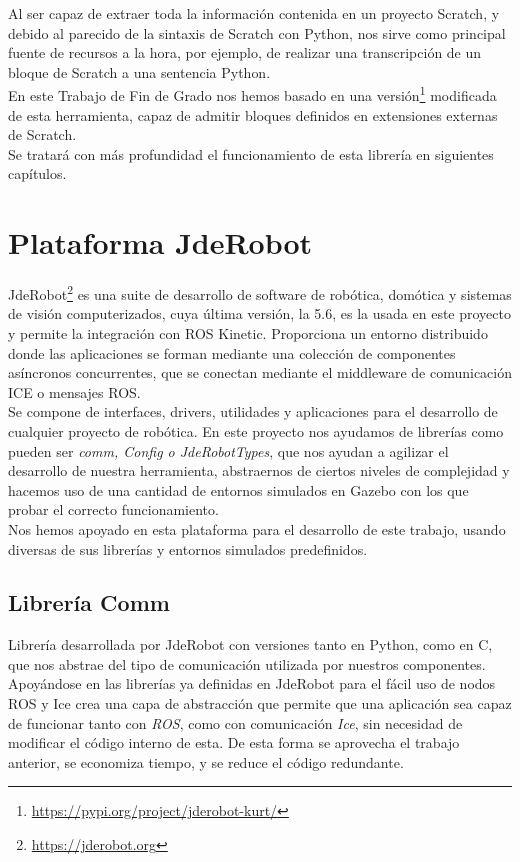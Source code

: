 Al ser capaz de extraer toda la información contenida en un proyecto Scratch, y debido al parecido de la sintaxis de Scratch con Python, nos sirve como principal fuente de recursos a la hora, por ejemplo, de realizar una transcripción de un bloque de Scratch a una sentencia Python.\\

En este Trabajo de Fin de Grado nos hemos basado en una versión\footnote{\url{https://pypi.org/project/jderobot-kurt/}} modificada de esta herramienta, capaz de admitir bloques definidos en extensiones externas de Scratch.\\

Se tratará con más profundidad el funcionamiento de esta librería en siguientes capítulos.

\section{Plataforma JdeRobot}
\label{sec:jderobot}
JdeRobot\footnote{\url{https://jderobot.org}} es una suite de desarrollo de software de robótica, domótica y sistemas de visión computerizados, cuya última versión, la 5.6, es la usada en este proyecto y permite la integración con ROS Kinetic. Proporciona un entorno distribuido donde las aplicaciones se forman mediante una colección de componentes asíncronos concurrentes, que se conectan mediante el middleware de comunicación ICE o mensajes ROS.\\

Se compone de interfaces, drivers, utilidades y aplicaciones para el desarrollo de cualquier proyecto de robótica. En este proyecto nos ayudamos de librerías como pueden ser \textit{comm, Config o JdeRobotTypes}, que nos ayudan a agilizar el desarrollo de nuestra herramienta, abstraernos de ciertos niveles de complejidad y hacemos uso de una cantidad de entornos simulados en Gazebo con los que probar el correcto funcionamiento.\\

Nos hemos apoyado en esta plataforma para el desarrollo de este trabajo, usando diversas de sus librerías y entornos simulados predefinidos.


\subsection{Librería Comm}
\label{sec:libreria-com}
Librería desarrollada por JdeRobot con versiones tanto en Python, como en C, que nos abstrae del tipo de comunicación utilizada por nuestros componentes. Apoyándose en las librerías ya definidas en JdeRobot para el fácil uso de nodos ROS y Ice crea una capa de abstracción que permite que una aplicación sea capaz de funcionar tanto con \textit{ROS}, como con comunicación \textit{Ice}, sin necesidad de modificar el código interno de esta. De esta forma se aprovecha el trabajo anterior, se economiza tiempo, y se reduce el código redundante.\\

